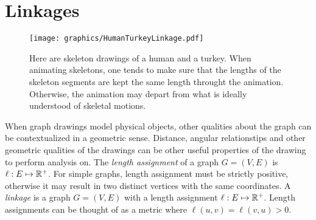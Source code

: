 \section{Linkages}
\begin{figure}[!htbp]
 \begin{center}
  \texttt{[image: graphics/HumanTurkeyLinkage.pdf]}
  \caption{Here are skeleton drawings of a human and a turkey.  When animating skeletons, one tends to make sure that the lengths of the skeleton segments are kept the same length throught the animation.  Otherwise, the animation may depart from what is ideally understood of skeletal motions.}
 \end{center} 
\end{figure}

When graph drawings model physical objects, other qualities about the graph can be contextualized in a geometric sense.  
Distance, angular relationstips and other geometric qualities of the drawings can be other useful properties of the drawing to perform analysis on.
The \textit{length assignment} of a graph $G=(V,E)$ is $\ell:E \mapsto {\mathbb{R}}^+$. 
For simple graphs, length assignment must be strictly positive, otherwise it may result in two distinct vertices with the same coordinates.
A \textit{linkage} is a graph $G = (V,E)$ with a length assignment $\ell:E \mapsto {\mathbb{R}}^+$.  
Length assignments can be thought of as a metric where $\ell(u,v) = \ell(v,u)>0$.






